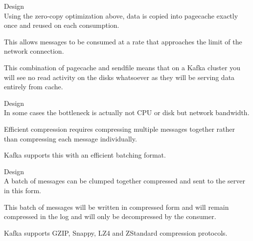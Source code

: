 \begin{frame}[plain,t]{Design} %
     \\
    \vspace{2ex}
    Using the zero-copy optimization above, data is copied into pagecache exactly once and reused on each consumption. %
    
    \vspace{2ex}
    This allows messages to be consumed at a rate that approaches the limit of the network connection.
    
    \vspace{2ex}
    This combination of pagecache and sendfile means that on a Kafka cluster 
    you will see no read activity on the disks whatsoever as they will be serving data entirely from cache.
    
\end{frame}
\begin{frame}[plain,t]{Design} %
     \\
    \vspace{2ex}
    In some cases the bottleneck is actually not CPU or disk but network bandwidth.
    
    \vspace{2ex}
    Efficient compression requires compressing multiple messages together rather than compressing each message individually.
    
    \vspace{2ex}
    Kafka supports this with an efficient batching format. 
    
\end{frame}
\begin{frame}[plain,t]{Design} %
     \\
    \vspace{2ex}
    A batch of messages can be clumped together compressed and sent to the server in this form. 
    
    \vspace{2ex}
    This batch of messages will be written in compressed form and will remain compressed in the log and will only be decompressed by the consumer.
    
    \vspace{2ex}
    Kafka supports GZIP, Snappy, LZ4 and ZStandard compression protocols.
    
    
\end{frame}


